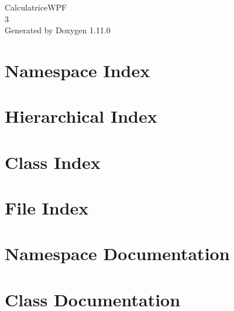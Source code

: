 \documentclass[twoside]{book}
\newcommand{\+}{\discretionary{\mbox{\scriptsize$\hookleftarrow$}}{}{}}
\newcommand{\clearemptydoublepage}{%
    \newpage{\pagestyle{empty}\cleardoublepage}%
  }
\begin{document}
  \raggedbottom
    \hypersetup{pageanchor=false,
                bookmarksnumbered=true,
                pdfencoding=unicode
               }
  \begin{titlepage}
  \vspace*{7cm}
  \begin{center}%
  {\Large Calculatrice\+WPF}\\
  [1ex]\large 3 \\
  \vspace*{1cm}
  {\large Generated by Doxygen 1.11.0}\\
  \end{center}
  \end{titlepage}
  \clearemptydoublepage
  \tableofcontents
  \clearemptydoublepage
  \hypersetup{pageanchor=true}
\chapter{Namespace Index}

\chapter{Hierarchical Index}

\chapter{Class Index}

\chapter{File Index}

\chapter{Namespace Documentation}


\chapter{Class Documentation}




\end{document}

